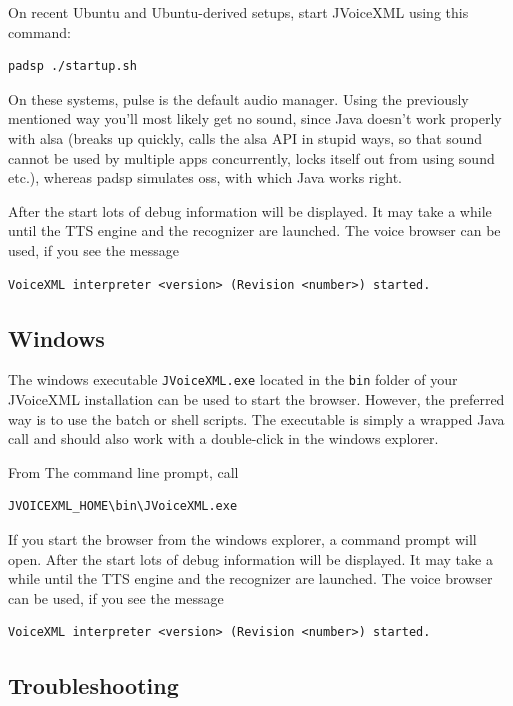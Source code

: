 \documentclass[11pt,a4paper]{book}
\begin{document}
On recent Ubuntu and Ubuntu-derived setups, start JVoiceXML using this command:
\begin{lstlisting}
padsp ./startup.sh
\end{lstlisting}

On these systems, pulse is the default audio manager. Using the previously
mentioned way you'll most likely get no
sound, since Java doesn't work properly with alsa (breaks up quickly, calls
the alsa API in stupid ways, so that sound cannot be used by multiple apps
concurrently, locks itself out from using sound etc.), whereas padsp simulates
oss, with which Java works right.


After the start lots of debug information will be displayed.
It may take a while until the TTS engine and the recognizer are launched.
The voice browser can be used, if you see the message

\begin{lstlisting}
VoiceXML interpreter <version> (Revision <number>) started.
\end{lstlisting}

\subsection{Windows}

The windows executable \texttt{JVoiceXML.exe} located in the \texttt{bin}
folder of your JVoiceXML installation can be used to start the browser.
However, the preferred way is to use the batch or shell scripts.
The executable is simply a wrapped Java call and should also work with a
double-click in the windows explorer.

From The command line prompt, call

\begin{lstlisting}
JVOICEXML_HOME\bin\JVoiceXML.exe
\end{lstlisting}

If you start the browser from the windows explorer, a command prompt will open.
After the start lots of debug information will be displayed.
It may take a while until the TTS engine and the recognizer are launched.
The voice browser can be used, if you see the message

\begin{lstlisting}
VoiceXML interpreter <version> (Revision <number>) started.
\end{lstlisting}

\subsection{Troubleshooting}
\end{document}
